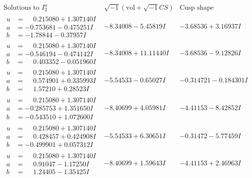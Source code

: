 \documentclass[1p]{elsarticle_modified}
\theoremstyle{definition}
\newcommand{\I}{\sqrt{-1}}
\begin{document}
$$\begin{array}{c|c|c}  
\text{Solutions to }I^u_{2}& \I (\text{vol} + \sqrt{-1}CS) & \text{Cusp shape}\\
 \hline 
\begin{aligned}
u &= \phantom{-}0.215080 + 1.307140 I \\
a &= -0.753681 - 0.475251 I \\
b &= -1.78844 - 0.37957 I\end{aligned}
 & -8.34008 - 5.45819 I & -3.68536 + 3.16937 I \\ \hline\begin{aligned}
u &= \phantom{-}0.215080 + 1.307140 I \\
a &= -0.546194 - 0.474142 I \\
b &= \phantom{-}0.403352 - 0.051960 I\end{aligned}
 & -8.34008 + 11.11440 I & -3.68536 - 9.12826 I \\ \hline\begin{aligned}
u &= \phantom{-}0.215080 + 1.307140 I \\
a &= \phantom{-}0.574901 + 0.335993 I \\
b &= \phantom{-}1.57210 + 0.28523 I\end{aligned}
 & -5.54533 - 0.65027 I & -0.314721 - 0.184301 I \\ \hline\begin{aligned}
u &= \phantom{-}0.215080 + 1.307140 I \\
a &= -0.285753 + 1.351650 I \\
b &= -0.543510 + 1.072600 I\end{aligned}
 & -8.40699 + 4.05981 I & -4.41153 - 8.42852 I \\ \hline\begin{aligned}
u &= \phantom{-}0.215080 + 1.307140 I \\
a &= \phantom{-}0.428457 + 0.424908 I \\
b &= -0.499901 + 0.057312 I\end{aligned}
 & -5.54533 + 6.30651 I & -0.31472 - 5.77459 I \\ \hline\begin{aligned}
u &= \phantom{-}0.215080 + 1.307140 I \\
a &= \phantom{-}0.91047 - 1.17250 I \\
b &= \phantom{-}1.24405 - 1.35425 I\end{aligned}
 & -8.40699 + 1.59643 I & -4.41153 + 2.46963 I \\ \hline\begin{aligned}

\end{aligned}
\end{array}$$
\end{document}
